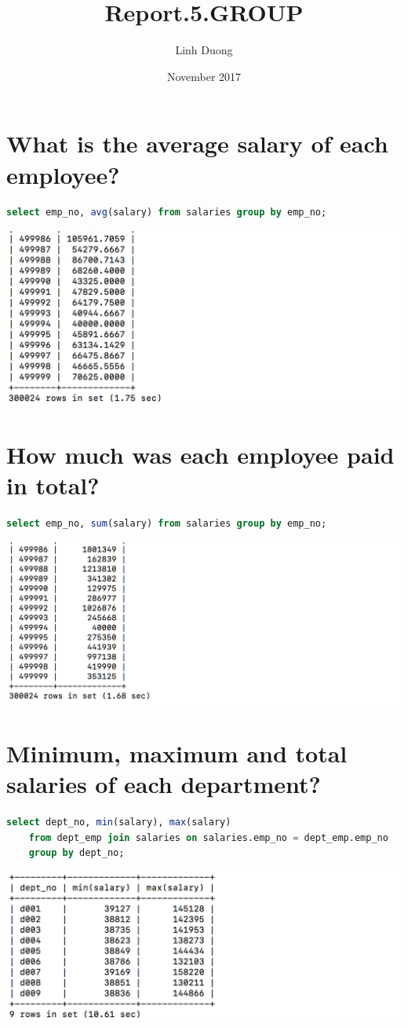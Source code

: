 \documentclass{article}
\title{Report.5.GROUP}
\author{Linh Duong}
\date{November 2017}
\begin{document}
\maketitle

\section{What is the average salary of each employee?}
\begin{lstlisting}[language=sql]
select emp_no, avg(salary) from salaries group by emp_no;
\end{lstlisting}
\includegraphics[width=\linewidth]{1.png}

\section{How much was each employee paid in total?}
\begin{lstlisting}[language=sql]
select emp_no, sum(salary) from salaries group by emp_no;
\end{lstlisting}
\includegraphics[width=\linewidth]{2.png}

\section{Minimum, maximum and total salaries of each department?}
\begin{lstlisting}[language=sql]
select dept_no, min(salary), max(salary) 
	from dept_emp join salaries on salaries.emp_no = dept_emp.emp_no
	group by dept_no;
\end{lstlisting}
\includegraphics[width=\linewidth]{3.png}
\end{document}
